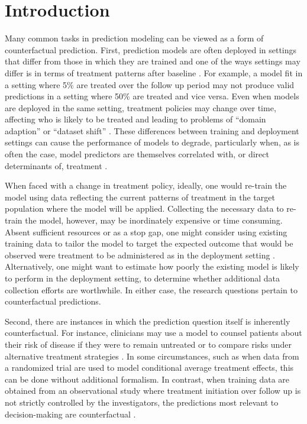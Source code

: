 \section{Introduction} \label{sec:introduction}

Many common tasks in prediction modeling can be viewed as a form of counterfactual prediction. First, prediction models are often deployed in settings that differ from those in which they are trained and one of the ways settings may differ is in terms of treatment patterns after baseline \cite{van_geloven_prediction_2020}. For example, a model fit in a setting where 5\% are treated over the follow up period may not produce valid predictions in a setting where 50\% are treated and vice versa. Even when models are deployed in the same setting, treatment policies may change over time, affecting who is likely to be treated and leading to problems of ``domain adaption'' or ``dataset shift'' \cite{finlayson_clinician_2021, subbaswamy_development_2020}. These differences between training and deployment settings can cause the performance of models to degrade, particularly when, as is often the case, model predictors are themselves correlated with, or direct determinants of, treatment \cite{pajouheshnia_accounting_2017,groenwold_explicit_2016-1}. 

When faced with a change in treatment policy, ideally, one would re-train the model using data reflecting the current patterns of treatment in the target population where the model will be applied. Collecting the necessary data to re-train the model, however, may be inordinately expensive or time consuming. Absent sufficient resources or as a stop gap, one might consider using existing training data to tailor the model to target the expected outcome that would be observed were treatment to be administered as in the deployment setting \cite{dickerman_predicting_2022}. Alternatively, one might want to estimate how poorly the existing model is likely to perform in the deployment setting, to determine whether additional data collection efforts are worthwhile. In either case, the research questions pertain to counterfactual predictions.

Second, there are instances in which the prediction question itself is inherently counterfactual. For instance, clinicians may use a model to counsel patients about their risk of disease if they were to remain untreated or to compare risks under alternative treatment strategies \cite{lin_scoping_2021,schulam_reliable_2017-1}. In some circumstances, such as when data from a randomized trial are used to model conditional average treatment effects, this can be done without additional formalism. In contrast, when training data are obtained from an observational study where treatment initiation over follow up is not strictly controlled by the investigators, the predictions most relevant to decision-making are counterfactual \cite{dickerman_counterfactual_2020,schulam_reliable_2017-1}. 

